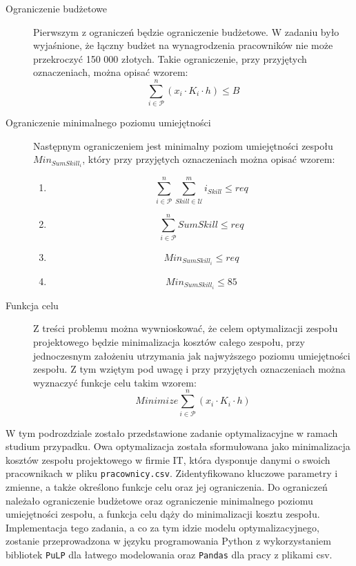     \begin{description}
        \item[Ograniczenie budżetowe] Pierwszym z ograniczeń będzie ograniczenie budżetowe. W zadaniu było wyjaśnione, że łączny budżet na wynagrodzenia pracowników nie może przekroczyć 150 000 złotych. Takie ograniczenie, przy przyjętych oznaczeniach, można opisać wzorem:
            \[
                \sum_{i \in \mathcal{P}}^{n} (x_{i} \cdot K_{i} \cdot h) \leq B
            \]
        
        \item[Ograniczenie minimalnego poziomu umiejętności] Następnym ograniczeniem jest minimalny poziom umiejętności zespołu     $Min_{SumSkill_{i}}$, który przy przyjętych oznaczeniach można opisać wzorem:
            \begin{enumerate}
                \item 
                    \[
                        \sum_{i \in \mathcal{P}}^{n} \sum_{Skill \in \mathcal{U}}^{m} i_{Skill} \leq req
                    \]
                \item 
                    \[
                        \sum_{i \in \mathcal{P}}^{n} SumSkill \leq req
                    \]      
                \item 
                    \[
                        Min_{SumSkill_{i}} \leq req
                    \]
                \item 
                    \[
                        Min_{SumSkill_{i}} \leq 85
                    \] 
        \end{enumerate} 
        
        \item[Funkcja celu] Z treści problemu można wywnioskować, że celem optymalizacji zespołu projektowego będzie minimalizacja kosztów całego zespołu, przy jednoczesnym założeniu utrzymania jak najwyższego poziomu umiejętności zespołu. Z  tym wziętym pod uwagę i przy przyjętych oznaczeniach można wyznaczyć funkcje celu takim wzorem:
            \[
               Minimize \sum_{i \in \mathcal{P}}^{n} (x_{i} \cdot K_{i} \cdot h)
            \]
    \end{description}

    \par W tym podrozdziale zostało przedstawione zadanie optymalizacyjne w ramach studium przypadku. Owa optymalizacja została sformułowana jako minimalizacja kosztów zespołu projektowego w firmie IT, która dysponuje danymi o swoich pracownikach w pliku \verb|pracownicy.csv|. Zidentyfikowano kluczowe parametry i zmienne, a także określono funkcje celu oraz jej ograniczenia. Do ograniczeń należało ograniczenie budżetowe oraz ograniczenie minimalnego poziomu umiejętności zespołu, a funkcja celu dąży do minimalizacji kosztu zespołu. Implementacja tego zadania, a co za tym idzie modelu optymalizacyjnego, zostanie przeprowadzona w języku programowania Python z wykorzystaniem bibliotek \verb|PuLP| dla łatwego modelowania oraz \verb|Pandas| dla pracy z plikami csv. 
    
